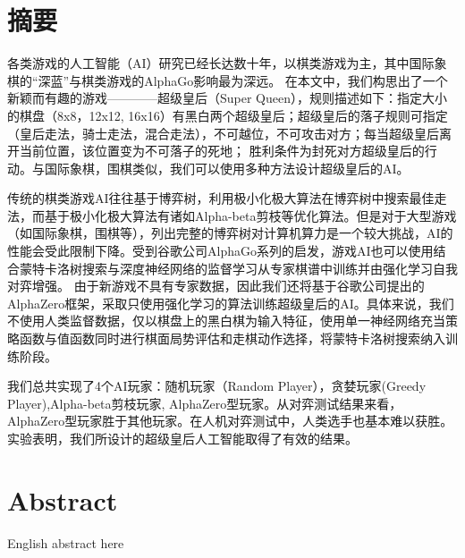 \chapter*{摘要}

各类游戏的人工智能（AI）研究已经长达数十年，以棋类游戏为主，其中国际象棋的“深蓝”与棋类游戏的AlphaGo影响最为深远。
在本文中，我们构思出了一个新颖而有趣的游戏————超级皇后（Super Queen），规则描述如下：指定大小的棋盘（8x8，12x12, 16x16）有黑白两个超级皇后；超级皇后的落子规则可指定（皇后走法，骑士走法，混合走法），不可越位，不可攻击对方；每当超级皇后离开当前位置，该位置变为不可落子的死地；
胜利条件为封死对方超级皇后的行动。与国际象棋，围棋类似，我们可以使用多种方法设计超级皇后的AI。


传统的棋类游戏AI往往基于博弈树，利用极小化极大算法在博弈树中搜索最佳走法，而基于极小化极大算法有诸如Alpha-beta剪枝等优化算法。但是对于大型游戏（如国际象棋，围棋等），列出完整的博弈树对计算机算力是一个较大挑战，AI的性能会受此限制下降。受到谷歌公司AlphaGo系列的启发，游戏AI也可以使用结合蒙特卡洛树搜索与深度神经网络的监督学习从专家棋谱中训练并由强化学习自我对弈增强。
由于新游戏不具有专家数据，因此我们还将基于谷歌公司提出的AlphaZero框架，采取只使用强化学习的算法训练超级皇后的AI。具体来说，我们不使用人类监督数据，仅以棋盘上的黑白棋为输入特征，使用单一神经网络充当策略函数与值函数同时进行棋面局势评估和走棋动作选择，将蒙特卡洛树搜索纳入训练阶段。


我们总共实现了4个AI玩家：随机玩家（Random Player），贪婪玩家(Greedy Player),Alpha-beta剪枝玩家, AlphaZero型玩家。从对弈测试结果来看，AlphaZero型玩家胜于其他玩家。在人机对弈测试中，人类选手也基本难以获胜。实验表明，我们所设计的超级皇后人工智能取得了有效的结果。


\chapter*{Abstract}

English abstract here
